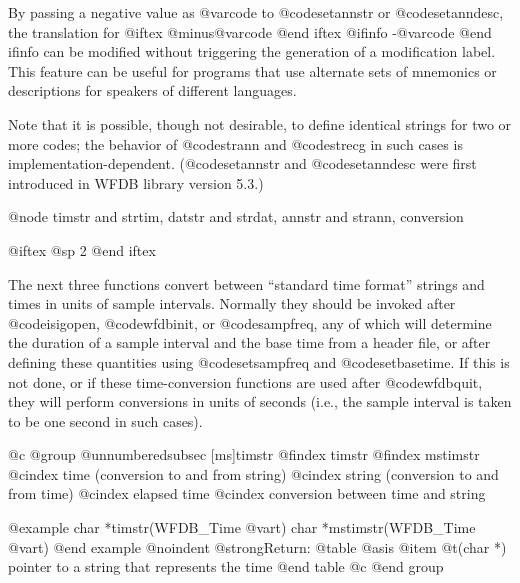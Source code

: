 {{{{{{{{{By passing a negative value as @var{code} to @code{setannstr} or
@code{setanndesc}, the translation for
@iftex
@minus{}@var{code}
@end iftex
@ifinfo
-@var{code}
@end ifinfo
can be modified without triggering the generation of a modification label.
This feature can be useful for programs that use alternate sets of
mnemonics or descriptions for speakers of different languages.

Note that it is possible, though not desirable, to define identical
strings for two or more codes; the behavior of @code{strann} and
@code{strecg} in such cases is implementation-dependent.
(@code{setannstr} and @code{setanndesc} were first introduced in WFDB
library version 5.3.)

@node     timstr and strtim, datstr and strdat, annstr and strann, conversion

@iftex
@sp 2
@end iftex

The next three functions convert between ``standard time format''
strings and times in units of sample intervals.  Normally they should be
invoked after @code{isigopen}, @code{wfdbinit}, or @code{sampfreq}, any of
which will determine the duration of a sample interval and the base time
from a header file, or after defining these quantities using
@code{setsampfreq} and @code{setbasetime}.  If this is not done, or if
these time-conversion functions are used after @code{wfdbquit}, they will
perform conversions in units of seconds (i.e., the sample interval is
taken to be one second in such cases).

@c @group
@unnumberedsubsec [ms]timstr
@findex timstr
@findex mstimstr
@cindex time (conversion to and from string)
@cindex string (conversion to and from time)
@cindex elapsed time
@cindex conversion between time and string

@example
char *timstr(WFDB_Time @var{t})
char *mstimstr(WFDB_Time @var{t})
@end example
@noindent
@strong{Return:}
@table @asis
@item @t{(char *)}
pointer to a string that represents the time
@end table
@c @end group

}}}}}}}}}
